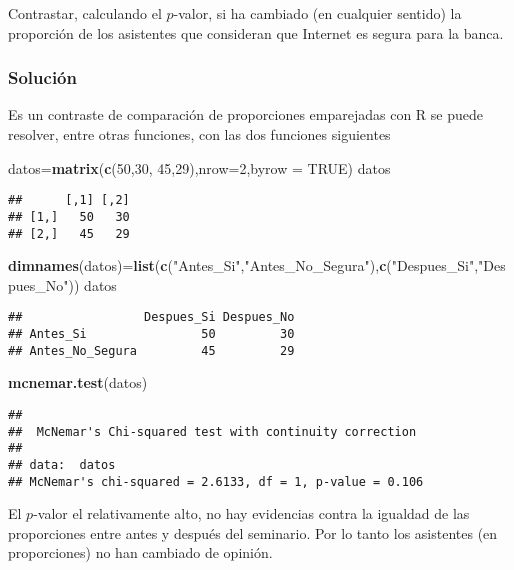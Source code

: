\documentclass[
]{article}
\newenvironment{Shaded}{\begin{snugshade}}{\end{snugshade}}
\newcommand{\DataTypeTok}[1]{\textcolor[rgb]{0.13,0.29,0.53}{#1}}
\newcommand{\DecValTok}[1]{\textcolor[rgb]{0.00,0.00,0.81}{#1}}
\newcommand{\KeywordTok}[1]{\textcolor[rgb]{0.13,0.29,0.53}{\textbf{#1}}}
\newcommand{\NormalTok}[1]{#1}
\newcommand{\OtherTok}[1]{\textcolor[rgb]{0.56,0.35,0.01}{#1}}
\newcommand{\StringTok}[1]{\textcolor[rgb]{0.31,0.60,0.02}{#1}}
\begin{document}
Contrastar, calculando el \(p\)-valor, si ha cambiado (en cualquier
sentido) la proporción de los asistentes que consideran que Internet es
segura para la banca.

\hypertarget{soluciuxf3n-4}{%
\subsubsection{Solución}\label{soluciuxf3n-4}}

Es un contraste de comparación de proporciones emparejadas con R se
puede resolver, entre otras funciones, con las dos funciones siguientes

\begin{Shaded}
\begin{Highlighting}[]
\NormalTok{datos=}\KeywordTok{matrix}\NormalTok{(}\KeywordTok{c}\NormalTok{(}\DecValTok{50}\NormalTok{,}\DecValTok{30}\NormalTok{, }\DecValTok{45}\NormalTok{,}\DecValTok{29}\NormalTok{),}\DataTypeTok{nrow=}\DecValTok{2}\NormalTok{,}\DataTypeTok{byrow =} \OtherTok{TRUE}\NormalTok{)}
\NormalTok{datos}
\end{Highlighting}
\end{Shaded}

\begin{verbatim}
##      [,1] [,2]
## [1,]   50   30
## [2,]   45   29
\end{verbatim}

\begin{Shaded}
\begin{Highlighting}[]
\KeywordTok{dimnames}\NormalTok{(datos)=}\KeywordTok{list}\NormalTok{(}\KeywordTok{c}\NormalTok{(}\StringTok{"Antes\_Si"}\NormalTok{,}\StringTok{"Antes\_No\_Segura"}\NormalTok{),}\KeywordTok{c}\NormalTok{(}\StringTok{"Despues\_Si"}\NormalTok{,}\StringTok{"Despues\_No"}\NormalTok{))}
\NormalTok{datos}
\end{Highlighting}
\end{Shaded}

\begin{verbatim}
##                 Despues_Si Despues_No
## Antes_Si                50         30
## Antes_No_Segura         45         29
\end{verbatim}

\begin{Shaded}
\begin{Highlighting}[]
\KeywordTok{mcnemar.test}\NormalTok{(datos)}
\end{Highlighting}
\end{Shaded}

\begin{verbatim}
## 
##  McNemar's Chi-squared test with continuity correction
## 
## data:  datos
## McNemar's chi-squared = 2.6133, df = 1, p-value = 0.106
\end{verbatim}

El \(p\)-valor el relativamente alto, no hay evidencias contra la
igualdad de las proporciones entre antes y después del seminario. Por lo
tanto los asistentes (en proporciones) no han cambiado de opinión.
\end{document}
